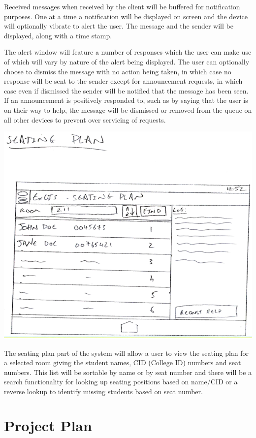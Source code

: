 \documentclass[a4paper, 12pt, notitlepage]{report}
\begin{document}
Received messages when received by the client will be buffered for notification purposes.  One at a time a notification will be displayed on screen and the device will optionally vibrate to alert the user.  The message and the sender will be displayed, along with a time stamp.

The alert window will feature a number of responses which the user can make use of which will vary by nature of the alert being displayed.  The user can optionally choose to dismiss the message with no action being taken, in which case no response will be sent to the sender except for announcement requests, in which case even if dismissed the sender will be notified that the message has been seen.  If an announcement is positively responded to, such as by saying that the user is on their way to help, the message will be dismissed or removed from the queue on all other devices to prevent over servicing of requests.

\includegraphics[width=\textwidth]{"GUI Sketches/Seating Plan Cropped"}

The seating plan part of the system will allow a user to view the seating plan for a selected room giving the student names, CID (College ID) numbers and seat numbers.  This list will be sortable by name or by seat number and there will be a search functionality for looking up seating positions based on name/CID or a reverse lookup to identify missing students based on seat number.

\chapter{Project Plan}
%
\end{document}
